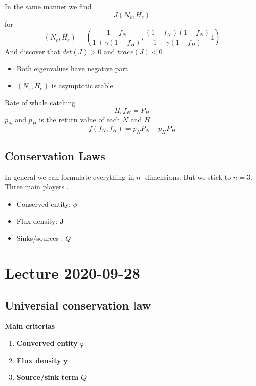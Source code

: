 \documentclass{article}
\theoremstyle{remark}
\begin{document}
  In the same manner we find \[
  J\left( N_{e}, H_{e} \right) 
  \] 
  for \[
  \left( N_{e} , H_{e} \right) = \left( \frac{1-f_{N}}{ 1 + \gamma  \left( 1 - f_{H} \right)}, \frac{\left( 1 - f_{N} \right) \left( 1 - f_{N} \right)}{ 1 + \gamma \left( 1 - f_{H} \right) } 1  \right)
  \] 
  And discover that $det\left( J \right) > 0$ and $trace\left( J \right) < 0$ 
\begin{itemize}
  \item Both eigenvalues have negative part
  \item  $\left( N_{e}, H_{e} \right)$ is asymptotic stable
\end{itemize}
Rate of whale catching \[
H_{e}f_{H} = P_{H}
\] 
$p_{N} $ and $p_{H}$ is the return value of each $N$ and $H$ \[
f\left( f_{N} , f_{H}  \right) = p_{N} P_{N} + p_{H}  P_{H}
\] 
  
\subsection{Conservation Laws}%
\label{sub:conservation_laws}

In general we can formulate everything in $n$- dimensions. But we stick to $n = 3 $.  Three main players .
 \begin{itemize}
  \item Conserved entity: $\phi $
  \item  Flux density: $\mathbf{J}$
  \item Sinks/sources : $Q$
\end{itemize}
  
  

\newpage
\section{Lecture 2020-09-28}%
\label{sec:lecture_2020_09_28}

\subsection{Universial conservation law}%
\label{sub:universial_conservation_law}

\textbf{Main criterias} 
\begin{enumerate}[label=(\roman*)]
  \item \textbf{Converved entity}   $\varphi $.
  \item \textbf{Flux density}  $\mathbf{y}$
  \item \textbf{Source/sink term}  $Q$
\end{enumerate}
\end{document}
